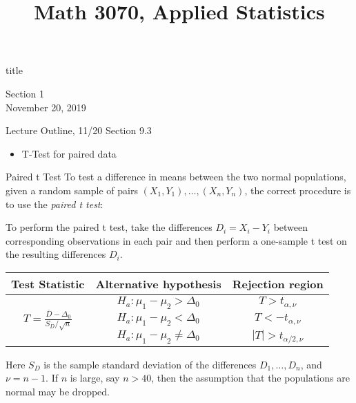 \documentclass[t,handout]{beamer}
\title{Math 3070, Applied Statistics}
\newcommand{\nl}[1]{\vspace{#1 em}}
\begin{document}
\begin{frame}[c]
    \begin{beamercolorbox}[rounded=true,wd=\textwidth,center]{title}
        \inserttitle
    \end{beamercolorbox}
    \begin{center}
        Section 1\\
        \nl{0.5}
        November 20, 2019
    \end{center}
\end{frame}
\begin{frame}[c]{Lecture Outline, 11/20}
    Section 9.3
    \begin{itemize}
        \item T-Test for paired data
    \end{itemize}
\end{frame}

\begin{frame}{Paired t Test}
    To test a difference in means between the two normal populations, given a random sample of pairs $(X_1,Y_1), \dots, (X_n,Y_n)$, the correct procedure is to use the \emph{paired t test}:
    
    \pause \vspace{.2cm}
    To perform the paired t test, take the differences $D_i=X_i-Y_i$ between corresponding observations in each pair and then perform a one-sample t test on the resulting differences $D_i$.
    
    \pause \begin{block}{}
    \begin{tabular}{c|c|c}
    Test Statistic & Alternative hypothesis & Rejection region \\ \hline
    \multirow{3}{*}{$\displaystyle T=\frac{\overline D-\Delta_0}{S_D/\sqrt{n}}$} & $H_a: \mu_1-\mu_2>\Delta_0$ & $T>t_{\alpha,\nu}$ \\
    & $H_a: \mu_1-\mu_2<\Delta_0$ & $T<-t_{\alpha,\nu}$ \\
    & $H_a: \mu_1-\mu_2\neq\Delta_0$ & $|T|>t_{\alpha/2,\nu}$\\
    \end{tabular}
    \end{block}
    \pause Here $S_D$ is the sample standard deviation of the differences $D_1,\dots,D_n$, and $\nu=n-1$. If $n$ is large, say $n>40$, then the assumption that the populations are normal may be dropped.
    
    \end{frame}
    
\end{document}
